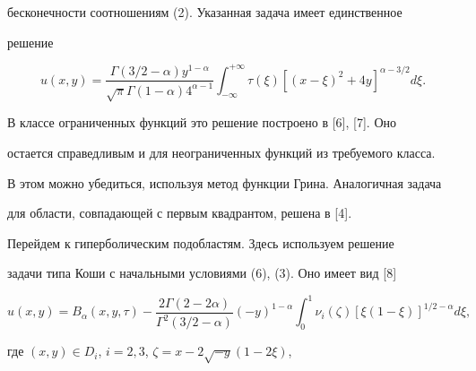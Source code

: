 бесконечности соотношениям (2). Указанная задача имеет единственное 


решение 


$$ 


u(x,y)=\frac{\Gamma(3/2-\alpha)y^{1-\alpha}} 


{\sqrt{\pi}\Gamma(1-\alpha)4^{\alpha-1}} 


\int^{+\infty}_{-\infty}\tau(\xi) 


[(x-\xi)^2+4y]^{\alpha-3/2}d\xi.


$$ 


В классе ограниченных функций это решение построено в [6], [7]. Оно 


остается справедливым и для неограниченных функций из требуемого класса. 


В этом можно убедиться, используя метод функции Грина. Аналогичная задача 


для области, совпадающей с первым квадрантом, решена в [4]. 


 


Перейдем к гиперболическим подобластям. Здесь используем решение 


задачи типа Коши с начальными условиями (6), (3). Оно имеет вид [8] 


$$ 


u(x,y)=B_\alpha(x,y,\tau)- 


\frac{2\Gamma(2-2\alpha)}{\Gamma^2(3/2-\alpha)}(-y)^{1-\alpha} 


\int^1_0\nu_i(\zeta)[\xi(1-\xi)]^{1/2-\alpha}d\xi, 


$$ 


где $(x,y)\in D_i$, $i=2,3$, $\zeta=x-2\sqrt{-y}(1-2\xi)$, 


